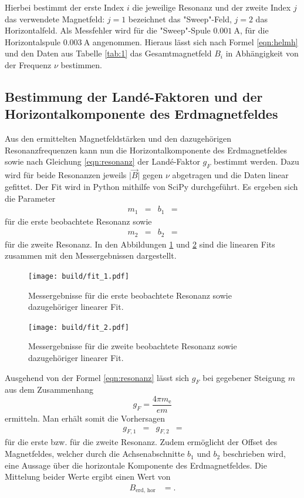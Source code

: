 Hierbei bestimmt der erste Index $i$ die jeweilige Resonanz und der zweite Index $j$ das verwendete Magnetfeld: $j=1$ bezeichnet das "Sweep"-Feld, $j=2$ das Horizontalfeld.
Als Messfehler wird für die "Sweep"-Spule $\SI{0.001}{\ampere}$, für die Horizontalspule $\SI{0.003}{\ampere}$ angenommen.
Hieraus lässt sich nach Formel \eqref{eqn:helmh} und den Daten aus Tabelle \ref{tab:1} das Gesamtmagnetfeld $B_i$ in Abhängigkeit von der Frequenz $\nu$ bestimmen.

\subsection{Bestimmung der Land\'{e}-Faktoren und der Horizontalkomponente des Erdmagnetfeldes}
Aus den ermittelten Magnetfeldstärken und den dazugehörigen Resonanzfrequenzen kann nun die Horizontalkomponente des Erdmagnetfeldes sowie nach Gleichung \ref{eqn:resonanz} der Land\'{e}-Faktor $g_F$ bestimmt werden.
Dazu wird für beide Resonanzen jeweils $\lvert \vec{B} \rvert$ gegen $\nu$ abgetragen und die Daten linear gefittet.
Der Fit wird in Python mithilfe von SciPy durchgeführt.
Es ergeben sich die Parameter
\begin{align*}
  m_1 &=  & b_1 &= 
\end{align*}
für die erste beobachtete Resonanz sowie
\begin{align*}
  m_2 &=  & b_2 &= 
\end{align*}
für die zweite Resonanz.
In den Abbildungen \ref{plot:1} und \ref{plot:2} sind die linearen Fits zusammen mit den Messergebnissen dargestellt.
\begin{figure}
  \centering
  \texttt{[image: build/fit\_1.pdf]}
  \caption{Messergebnisse für die erste beobachtete Resonanz sowie dazugehöriger linearer Fit.}
  \label{plot:1}
\end{figure}

\begin{figure}
  \centering
  \texttt{[image: build/fit\_2.pdf]}
  \caption{Messergebnisse für die zweite beobachtete Resonanz sowie dazugehöriger linearer Fit.}
  \label{plot:2}
\end{figure}

Ausgehend von der Formel \ref{eqn:resonanz} lässt sich $g_F$ bei gegebener Steigung $m$ aus dem Zusammenhang
\begin{equation}
  g_F = \frac{4 \pi m_\text{e}}{e m}
\end{equation}
ermitteln.
Man erhält somit die Vorhersagen
\begin{align*}
  g_{F,1} &=  & g_{F,2} &= 
\end{align*}
für die erste bzw. für die zweite Resonanz.
Zudem ermöglicht der Offset des Magnetfeldes, welcher durch die Achsenabschnitte $b_1$ und $b_2$ beschrieben wird, eine Aussage über die horizontale Komponente des Erdmagnetfeldes.
Die Mittelung beider Werte ergibt einen Wert von
\begin{align*}
  B_\text{erd, hor} &= .
\end{align*}

